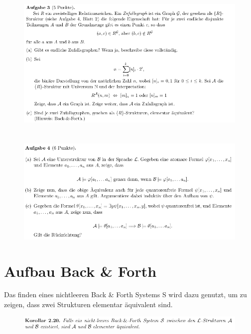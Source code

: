 \documentclass[a4paper]{scrartcl}
\begin{document}
    \begin{figure}[H]
        \centering
        \includegraphics[scale=0.6]{./A-3.png}
        \label{fig:}
    \end{figure}

\section*{}%
\label{sec:aufgabe_4}

    \begin{figure}[H]
        \centering
        \includegraphics[scale=0.6]{./A-4.png}
        \label{fig:}
    \end{figure}


\section*{Aufbau Back \& Forth}%
\label{sec:aufbau_back_forth}
    Das finden eines nichtleeren Back \& Forth Systems S wird dazu genutzt, um zu zeigen, dass zwei Strukturen elementar äquivalent sind.
    \begin{figure}[H]
        \centering
        \includegraphics[scale=0.6]{./B&F-EA.png}
        \label{fig:}
    \end{figure}
\end{document}
